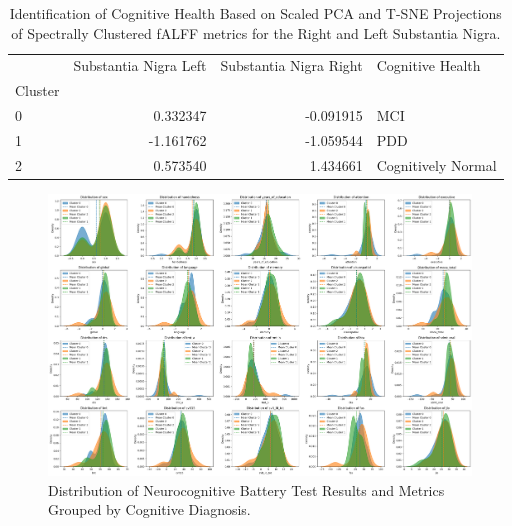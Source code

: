 \documentclass[12pt]{article}
\begin{document}
\begin{table}[ht]
\centering
\begin{tabular}{lrrl}
    \toprule
     & Substantia Nigra Left & Substantia Nigra Right & Cognitive Health \\
    Cluster &  &  &  \\
    \midrule
    0 & 0.332347 & -0.091915 & MCI \\
    1 & -1.161762 & -1.059544 & PDD \\
    2 & 0.573540 & 1.434661 & Cognitively Normal \\
    \bottomrule
\end{tabular}
\caption{Identification of Cognitive Health Based on Scaled PCA and T-SNE Projections of Spectrally Clustered fALFF metrics for the Right and Left Substantia Nigra.}
\label{tab:example}  %
\end{table}


\FloatBarrier  %

\begin{figure}[h]  %
    \centering
    \includegraphics[width=\textwidth]{"../img/pdf_of_clustered_test_results.png"}  %
    \caption{Distribution of Neurocognitive Battery Test Results and Metrics Grouped by Cognitive Diagnosis.}
    \label{fig:pdf}  %
\end{figure}

\FloatBarrier
\end{document}
